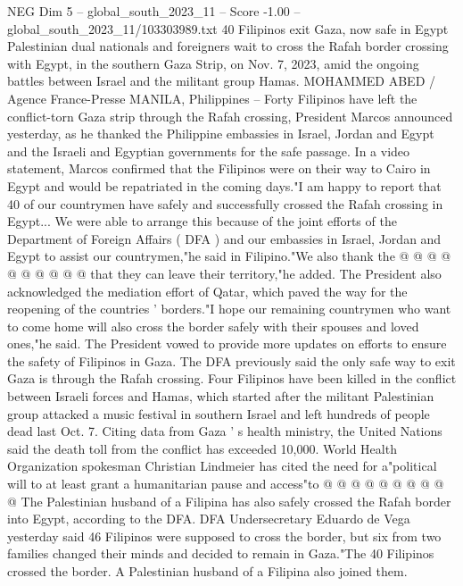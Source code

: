 \begin{textsample}{NEG Dim 5 – global\_south\_2023\_11 – Score -1.00 – global\_south\_2023\_11/103303989.txt}  \label{ex:f5_neg_171}
40 Filipinos exit Gaza, now safe in Egypt Palestinian dual nationals and foreigners wait to cross the Rafah border crossing with Egypt, in the southern Gaza Strip, on Nov. 7, 2023, amid the ongoing battles between Israel and the militant group Hamas.
MOHAMMED ABED / Agence France-Presse MANILA, Philippines -- Forty Filipinos have left the conflict-torn Gaza strip through the Rafah crossing, President Marcos announced yesterday, as he thanked the Philippine embassies in Israel, Jordan and Egypt and the Israeli and Egyptian governments for the safe passage.
In a video statement, Marcos confirmed that the Filipinos were on their way to Cairo in Egypt and would be repatriated in the coming days."I am happy to report that 40 of our countrymen have safely and successfully crossed the Rafah crossing in Egypt...
We were able to arrange this because of the joint efforts of the Department of Foreign Affairs ( DFA ) and our embassies in Israel, Jordan and Egypt to assist our countrymen,"he said in Filipino."We also thank the @ @ @ @ @ @ @ @ @ @ that they can leave their territory,"he added.
The President also acknowledged the mediation effort of Qatar, which paved the way for the reopening of the countries ' borders."I hope our remaining countrymen who want to come home will also cross the border safely with their spouses and loved ones,"he said.
The President vowed to provide more updates on efforts to ensure the safety of Filipinos in Gaza.
The DFA previously said the only safe way to exit Gaza is through the Rafah crossing.
Four Filipinos have been killed in the conflict between Israeli forces and Hamas, which started after the militant Palestinian group attacked a music festival in southern Israel and left hundreds of people dead last Oct. 7.
Citing data from Gaza ' s health ministry, the United Nations said the death toll from the conflict has exceeded 10,000.
World Health Organization spokesman Christian Lindmeier has cited the need for a"political will to at least grant a humanitarian pause and access"to @ @ @ @ @ @ @ @ @ @ The Palestinian husband of a Filipina has also safely crossed the Rafah border into Egypt, according to the DFA.
DFA Undersecretary Eduardo de Vega yesterday said 46 Filipinos were supposed to cross the border, but six from two families changed their minds and decided to remain in Gaza."The 40 Filipinos crossed the border.
A Palestinian husband of a Filipina also joined them.

\end{textsample}
